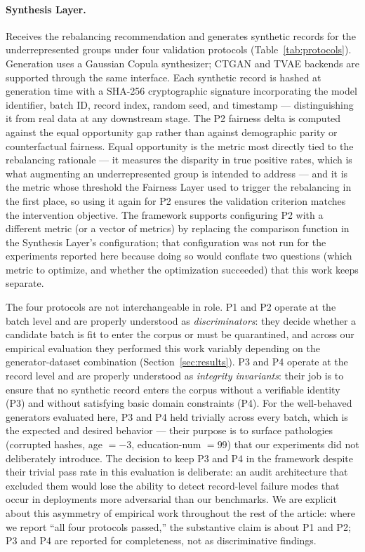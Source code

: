 \documentclass[11pt]{article}
\begin{document}
\paragraph{Synthesis Layer.} Receives the rebalancing recommendation and generates synthetic records for the underrepresented groups under four validation protocols (Table~\ref{tab:protocols}). Generation uses a Gaussian Copula synthesizer; CTGAN and TVAE backends are supported through the same interface. Each synthetic record is hashed at generation time with a SHA-256 cryptographic signature incorporating the model identifier, batch ID, record index, random seed, and timestamp --- distinguishing it from real data at any downstream stage. The P2 fairness delta is computed against the equal opportunity gap rather than against demographic parity or counterfactual fairness. Equal opportunity is the metric most directly tied to the rebalancing rationale --- it measures the disparity in true positive rates, which is what augmenting an underrepresented group is intended to address --- and it is the metric whose threshold the Fairness Layer used to trigger the rebalancing in the first place, so using it again for P2 ensures the validation criterion matches the intervention objective. The framework supports configuring P2 with a different metric (or a vector of metrics) by replacing the comparison function in the Synthesis Layer's configuration; that configuration was not run for the experiments reported here because doing so would conflate two questions (which metric to optimize, and whether the optimization succeeded) that this work keeps separate.

The four protocols are not interchangeable in role. P1 and P2 operate at the batch level and are properly understood as \emph{discriminators}: they decide whether a candidate batch is fit to enter the corpus or must be quarantined, and across our empirical evaluation they performed this work variably depending on the generator-dataset combination (Section~\ref{sec:results}). P3 and P4 operate at the record level and are properly understood as \emph{integrity invariants}: their job is to ensure that no synthetic record enters the corpus without a verifiable identity (P3) and without satisfying basic domain constraints (P4). For the well-behaved generators evaluated here, P3 and P4 held trivially across every batch, which is the expected and desired behavior --- their purpose is to surface pathologies (corrupted hashes, age $= -3$, education-num $= 99$) that our experiments did not deliberately introduce. The decision to keep P3 and P4 in the framework despite their trivial pass rate in this evaluation is deliberate: an audit architecture that excluded them would lose the ability to detect record-level failure modes that occur in deployments more adversarial than our benchmarks. We are explicit about this asymmetry of empirical work throughout the rest of the article: where we report ``all four protocols passed,'' the substantive claim is about P1 and P2; P3 and P4 are reported for completeness, not as discriminative findings.
\end{document}
